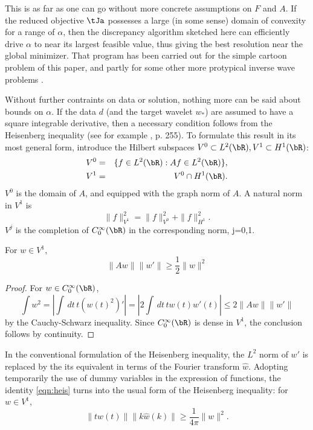 This is as far as one can go without more concrete assumptions on $F$
and $A$. If the reduced
objective $\tJa$ possesses a large (in some sense) domain of convexity for a range of $\alpha$, then the discrepancy algorithm sketched
here can efficiently drive $\alpha$ to near its largest feasible
value, thus giving the best resolution near the global minimizer. That
program has been carried out for the simple cartoon problem of this
paper, and partly for some other more protypical inverse wave problems \cite[]{FuSymes2017discrepancy}.

Without further contraints on data or solution, nothing more can be
said about bounds on $\alpha$. If the data $d$ (and the target wavelet
$w_*$) are assumed to have a square integrable derivative, then a
necessary condition follows from the Heisenberg
inequality (see for example \cite{Folland:07}, p. 255). To formulate
this result in its most general form, introduce the Hilbert subspaces
$V^0 \subset L^2(\bR), V^1 \subset H^1(\bR)$:
\begin{eqnarray}
  V^0 & = & \{ f \in L^2(\bR): Af \in L^2(\bR)\}, \nonumber\\
  V^1 & = & V^0 \cap H^1(\bR).
            \label{eqn:vdef}
\end{eqnarray}
$V^0$ is the domain of $A$, and equipped with the graph norm of $A$. A
natural norm in $V^1$ is
\[
  \|f\|^2_{V^1} = \|f\|_{V^0}^2 + \|f\|_{H^1}^2.
\]
$V^j$ is the completion of $C_0^{\infty}(\bR)$ in the corresponding
norm, j=0,1.

\begin{proposition}
  \label{thm:heis}
For $w \in V^1$,
  \begin{equation}
    \label{eqn:heis}
    \|Aw\|\|w'\| \ge \frac{1}{2}\|w\|^2
  \end{equation}
\end{proposition}

\begin{proof}
  For $w \in C_0^{\infty}(\bR)$,
  \[
    \int w^2 = \left|\int\,dt\, t (w(t)^2)' \right|= \left|2\int\,dt\,tw(t)w'(t)\right| \le
    2\|Aw\| \|w'\|
  \]
  by the Cauchy-Schwarz inequality. Since $C_0^{\infty}(\bR)$ is dense
  in $V^1$, the conclusion follows by continuity.
\end{proof}

In the conventional formulation of the Heisenberg inequality, the $L^2$ norm of
$w'$ is replaced by the its equivalent in terms of the Fourier
transform $\hat{w}$. Adopting temporarily the use of dummy variables
in the expression of functions, the identity \ref{eqn:heis} turns into
the usual form of the Heisenberg inequality: for $w \in V^1$,
\begin{equation}
\label{eqn:fheis}
\|tw(t)\|\|k\hat{w}(k)\| \ge \frac{1}{4\pi}\|w\|^2.
\end{equation}

